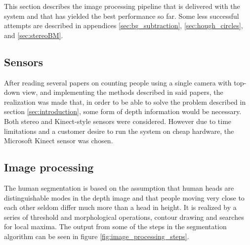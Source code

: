 This section describes the image processing pipeline that is delivered with the system and that has yielded the best performance so far. Some less successful attempts are described in appendices \ref{sec:bg_subtraction}, \ref{sec:hough_circles}, and \ref{sec:stereoBM}. 

\subsection{Sensors}
After reading several papers on counting people using a single camera with top-down view, and implementing the methods described in said papers, the realization was made that, in order to be able to solve the problem described in section \ref{sec:introduction}, some form of depth information would be necessary. Both stereo and Kinect-style sensors were considered. However due to time limitations and a customer desire to run the system on cheap hardware, the Microsoft Kinect sensor was chosen.

\subsection{Image processing}
The human segmentation is based on the assumption that human heads are distinguishable modes in the depth image and that people moving very close to each other seldom differ much more than a head in height. It is realized by a series of threshold and morphological operations, contour drawing and searches for local maxima. The output from some of the steps in the segmentation algorithm can be seen in figure \ref{fig:image_processing_steps}.

